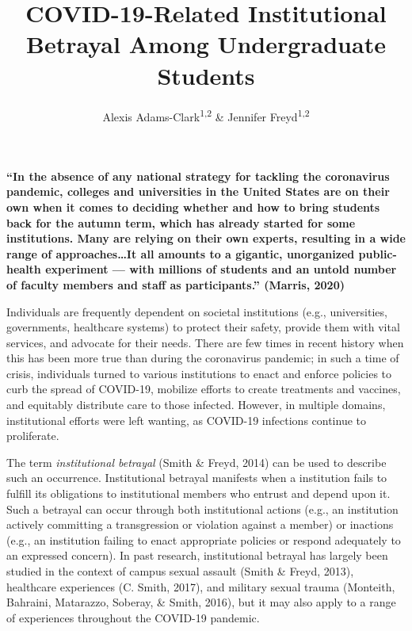 \documentclass[
  english,
  man, noextraspace]{apa6}
\title{\textbf{COVID-19-Related Institutional Betrayal Among Undergraduate Students}}
\author{Alexis Adams-Clark\textsuperscript{1,2} \& Jennifer Freyd\textsuperscript{1,2}}
\date{}
\affiliation{\vspace{0.5cm}\textsuperscript{1} University of Oregon\\\textsuperscript{2} Center for Institutional Courage}
\begin{document}
\maketitle

\raggedbottom
\centering

\textbf{\enquote{In the absence of any national strategy for tackling the coronavirus pandemic, colleges and universities in the United States are on their own when it comes to deciding whether and how to bring students back for the autumn term, which has already started for some institutions. Many are relying on their own experts, resulting in a wide range of approaches\ldots It all amounts to a gigantic, unorganized public-health experiment --- with millions of students and an untold number of faculty members and staff as participants.} (Marris, 2020)}

\raggedright

\setlength{\parindent}{5ex}

Individuals are frequently dependent on societal institutions (e.g., universities, governments, healthcare systems) to protect their safety, provide them with vital services, and advocate for their needs. There are few times in recent history when this has been more true than during the coronavirus pandemic; in such a time of crisis, individuals turned to various institutions to enact and enforce policies to curb the spread of COVID-19, mobilize efforts to create treatments and vaccines, and equitably distribute care to those infected. However, in multiple domains, institutional efforts were left wanting, as COVID-19 infections continue to proliferate.

The term \emph{institutional betrayal} (Smith \& Freyd, 2014) can be used to describe such an occurrence. Institutional betrayal manifests when a institution fails to fulfill its obligations to institutional members who entrust and depend upon it. Such a betrayal can occur through both institutional actions (e.g., an institution actively committing a transgression or violation against a member) or inactions (e.g., an institution failing to enact appropriate policies or respond adequately to an expressed concern). In past research, institutional betrayal has largely been studied in the context of campus sexual assault (Smith \& Freyd, 2013), healthcare experiences (C. Smith, 2017), and military sexual trauma (Monteith, Bahraini, Matarazzo, Soberay, \& Smith, 2016), but it may also apply to a range of experiences throughout the COVID-19 pandemic.
\end{document}
